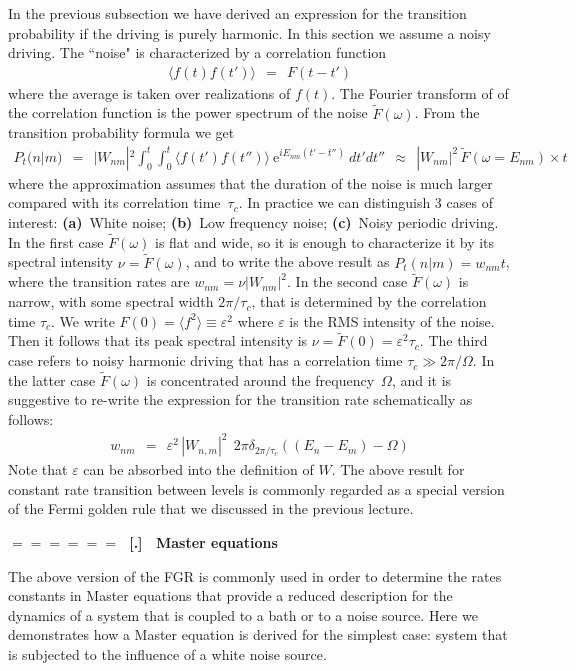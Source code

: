 \documentclass[onecolumn,fleqn]{revtex4}
\newcommand{\eexp}{\mathrm{e}^}
\newcommand{\beq}{\begin{eqnarray}}
\newcommand{\eeq}{\end{eqnarray}}
\renewcommand{\thesubsection}{\arabic{subsection}}
\renewcommand{\thesubsubsection}{\arabic{subsubsection}}
\newcommand{\sheadC}[1]
{
\addtocounter{subsubsection}{1}
\vspace{5mm}
{\Large\bf $=\!=\!=\!=\!=\!=\;$ [\thesubsection.\thesubsubsection] \ #1}  
\nopagebreak
\phantomsection
}
\begin{document}
In the previous subsection we have derived an expression 
for the transition probability if the driving is 
purely harmonic. In this section we assume 
a noisy driving. The ``noise"  is characterized by  
a correlation function 
\beq
\langle f(t)f(t') \rangle \ \ = \ \  F(t-t')  
\eeq
where the average is taken over realizations of $f(t)$.  
The Fourier transform of of the correlation function 
is the power spectrum  of the noise $\tilde{F}(\omega)$.
From the  transition probability formula we get 
\beq
P_t(n|m) \ \ = \ \ 
|W_{nm}|^2 \int_0^t\int_0^t  \langle f(t')f(t'')\rangle \ \eexp{iE_{nm}(t'-t'')} \ dt'dt''
\ \ \approx \ \ 
|W_{nm}|^2  \, \tilde{F}(\omega{=}E_{nm}) \times t
\eeq
where the approximation assumes that the duration of the noise 
is much larger compared with its correlation time~$\tau_c$.  
In practice we can distinguish 3 cases of interest: 
{\bf (a)}~White noise; 
{\bf (b)}~Low frequency noise; 
{\bf (c)}~Noisy periodic driving. 
In the first case $\tilde{F}(\omega)$ is flat and wide, 
so it is enough to characterize it by its spectral 
intensity ${\nu=\tilde{F}(\omega)}$, and to write the above 
result as ${P_t(n|m) = w_{nm}t}$, where the transition rates  
are ${w_{nm}=\nu|W_{nm}|^2}$. 
In the second case $\tilde{F}(\omega)$ is narrow, 
with some spectral width $2\pi/\tau_c$, that is determined 
by the correlation time $\tau_c$. 
We write ${F(0)= \langle f^2 \rangle \equiv \varepsilon^2}$
where $\varepsilon$ is the RMS intensity of the noise. 
Then it follows that its peak spectral intensity
is ${\nu=\tilde{F}(0)=\varepsilon^2 \tau_c}$. 
The third case refers to noisy harmonic driving 
that has a correlation time ${\tau_c \gg 2\pi/\Omega}$. 
In the latter case $\tilde{F}(\omega)$ is concentrated 
around the frequency~$\Omega$,  
and it is suggestive to re-write the expression for 
the transition rate schematically as follows:  
\beq
w_{nm}
\ \  = \ \ 
\varepsilon^2 \, |W_{n,m}|^2  \ \ 2\pi \delta_{2\pi/\tau_c}((E_{n}-E_{m})-\Omega) 
\eeq
Note that $\varepsilon$ can be absorbed into the definition of $W$. 
The above result for constant rate transition between levels  
is commonly regarded as a special version of the Fermi golden rule 
that we discussed in the previous lecture.   



\sheadC{Master equations} 

The above version of the FGR is commonly used in order to determine 
the rates constants in Master equations that 
provide a reduced description for the dynamics   
of a system that is coupled to a bath or to a noise source. 
Here we demonstrates how a Master equation is derived 
for the simplest case: system that is subjected  
to the influence of a white noise source. 
\end{document}
